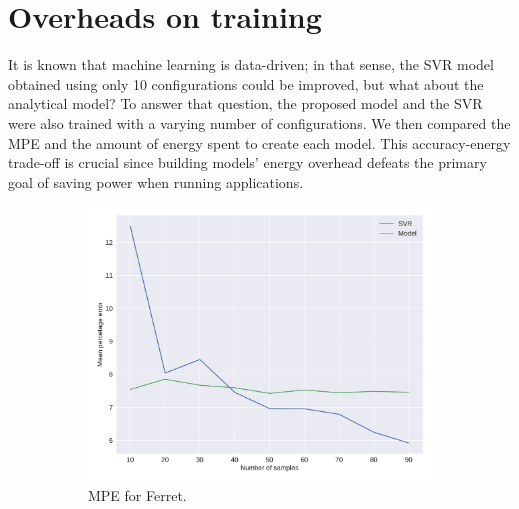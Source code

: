 \section{Overheads on training} \label{subsec:overhead_on_training}
It is known that machine learning is data-driven; in that sense, the SVR model obtained using only 10 configurations could be improved, but what about the analytical model? 
To answer that question, the proposed model and the SVR were also trained with a varying number of configurations.
We then compared the MPE and the amount of energy spent to create each model. 
This accuracy-energy trade-off is crucial since building models' energy overhead defeats the primary goal of saving power when running applications.
\enlargethispage{.5cm}

\begin{figure}[H]
	\centering
	\captionsetup[subfigure]{justification=centering}
	\begin{subfigure}[b]{0.45\textwidth}
		\centerline{\includegraphics[width=\columnwidth]{models/figures/overhead/completo_ferret_4.pdf}}
		\caption{MPE for Ferret.}
		\label{fig:overhead_ferret}
	\end{subfigure}
	\begin{subfigure}[b]{0.45\textwidth}

\end{subfigure}
\end{figure}
